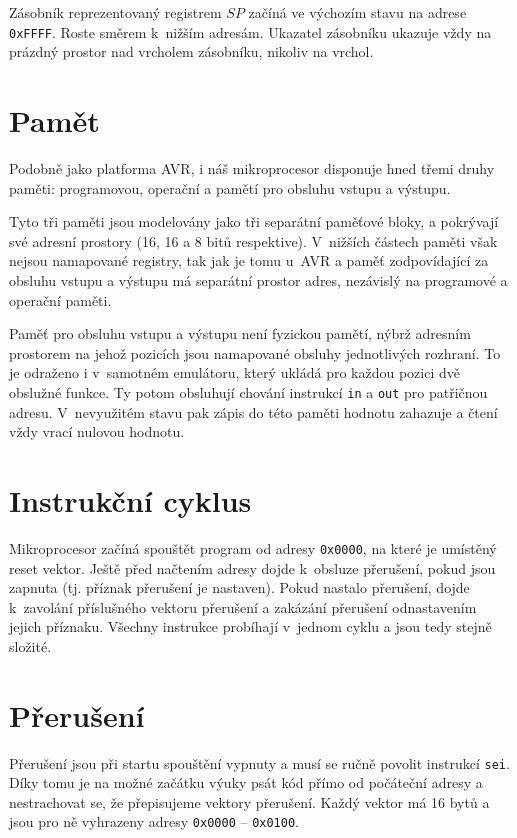 Zásobník reprezentovaný registrem $SP$ začíná ve výchozím stavu na adrese \texttt{0xFFFF}. Roste směrem k~nižším adresám. Ukazatel zásobníku ukazuje vždy na prázdný prostor nad vrcholem zásobníku, nikoliv na vrchol.

\section{Pamět}

Podobně jako platforma AVR\cite{attiny12-datasheet}, i náš mikroprocesor disponuje hned třemi druhy paměti: programovou, operační a pamětí pro obsluhu vstupu a výstupu.

Tyto tři paměti jsou modelovány jako tři separátní paměťové bloky, a pokrývají své adresní prostory (16, 16 a 8 bitů respektive). V~nižších částech paměti však nejsou namapované registry, tak jak je tomu u~AVR\cite{attiny12-datasheet} a paměť zodpovídající za obsluhu vstupu a výstupu má separátní prostor adres, ne\-zá\-vis\-lý na programové a operační paměti.

Paměť pro obsluhu vstupu a výstupu není fyzickou pamětí, nýbrž adresním prostorem na jehož pozicích jsou namapované obsluhy jednotlivých rozhraní. To je odraženo i v~samotném emulátoru, který ukládá pro každou pozici dvě obslužné funkce. Ty potom obsluhují chování instrukcí \texttt{in} a \texttt{out} pro patřičnou adresu. V~nevyužitém stavu pak zápis do této paměti hodnotu zahazuje a čtení vždy vrací nulovou hodnotu.

\section{Instrukční cyklus}

Mikroprocesor začíná spouštět program od adresy \texttt{0x0000}, na které je umístěný reset vektor. Ještě před načtením adresy dojde k~obsluze přerušení, pokud jsou zapnuta (tj. příznak přerušení je nastaven). Pokud nastalo přerušení, dojde k~zavolání příslušného vektoru přerušení a zakázání přerušení odnastavením jejich příznaku. Všechny instrukce probíhají v~jednom cyklu a jsou tedy stejně složité.

\section{Přerušení}

Přerušení jsou při startu spouštění vypnuty a musí se ručně povolit instrukcí \texttt{sei}. Díky tomu je na možné začátku výuky psát kód přímo od počáteční adresy a nestrachovat se, že přepisujeme vektory přerušení. Každý vektor má 16 bytů a jsou pro ně vyhrazeny adresy \texttt{0x0000} -- \texttt{0x0100}. 

